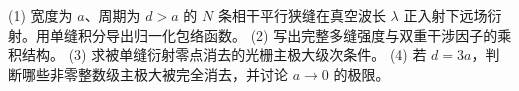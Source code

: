 (1) 宽度为 \(a\)、周期为 \(d>a\) 的 \(N\) 条相干平行狭缝在真空波长 \(\lambda\) 正入射下远场衍射。用单缝积分导出归一化包络函数。
(2) 写出完整多缝强度与双重干涉因子的乘积结构。
(3) 求被单缝衍射零点消去的光栅主极大级次条件。
(4) 若 \(d=3a\)，判断哪些非零整数级主极大被完全消去，并讨论 \(a\to0\) 的极限。
